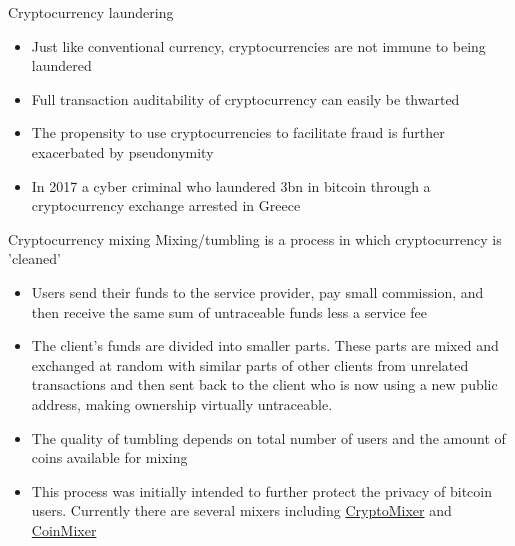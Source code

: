 \documentclass[9pt]{beamer}
\begin{document}

\begin{frame}{Cryptocurrency laundering}
	\begin{itemize}
		\item Just like conventional currency, cryptocurrencies are not immune to being laundered
		\item Full transaction auditability of cryptocurrency can easily be thwarted
		\item The propensity to use cryptocurrencies to facilitate fraud is further exacerbated by pseudonymity
		\item In 2017 a cyber criminal who laundered \textsterling3bn in bitcoin through a cryptocurrency exchange arrested in Greece
	\end{itemize}
\end{frame}


\begin{frame}{Cryptocurrency mixing}
	Mixing/tumbling is a process in which cryptocurrency is 'cleaned'
	\begin{itemize}
		\item Users send their funds to the service provider, pay small commission, and then receive the same sum of untraceable funds less a service fee
		\item The client's funds are divided into smaller parts. These parts are mixed and exchanged at random with similar parts of other clients from unrelated transactions and then sent back to the client who is now using a new public address, making ownership virtually untraceable.
		\item The quality of tumbling depends on total number of users and the amount of coins available for mixing
		\item This process was initially intended to further protect the privacy of bitcoin users. Currently there are several mixers including \href{https://cryptomixer.io}{CryptoMixer} and \href{https://coinmixer.se/en/}{CoinMixer}
	\end{itemize}
\end{frame}

\end{document}
